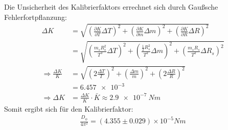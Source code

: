\documentclass{report}
\begin{document}
Die Unsicherheit des Kalibrierfaktors  errechnet sich durch Gaußsche Fehlerfortpflanzung:
\begin{equation}
    \begin{split}
        \Delta K &= \sqrt{\left(\frac{\partial K}{\partial T} \Delta T\right)^2 + \left(\frac{\partial K}{\partial m} \Delta m\right)^2 + \left(\frac{\partial K}{\partial R} \Delta R\right)^2}\\
                 &= \sqrt{\left(\frac{m_s R_s^2}{T^3} \Delta T\right)^2 + \left(\frac{\frac{1}{2} R_s^2}{T^2} \Delta m\right)^2 + \left(\frac{m_s R_s}{T^2} \Delta R_s\right)^2} \\
        \Rightarrow \frac{\Delta K}{K} &= \sqrt{\left(2\frac{\Delta T}{T}\right)^2 + \left(\frac{\Delta m}{m}\right)^2 + \left(2\frac{\Delta R}{R}\right)^2} \\
                                       &= \qty{6.457e-3}{} \\
        \Rightarrow \Delta K &= \frac{\Delta K}{K} \cdot \bar{K} \approx \boxed{\qty{2.9e-7}{Nm}}
    \end{split}
\end{equation}
Somit ergibt sich für den Kalibrierfaktor:
\begin{equation}
    \begin{split}
        \boxed{\frac{D_{\phi}}{4\pi^2} = (4.355 \pm 0.029) \times 10^{-5} \si{Nm}}
    \end{split}
    \label{eq:Kalibrierfaktor}
\end{equation}
\end{document}
